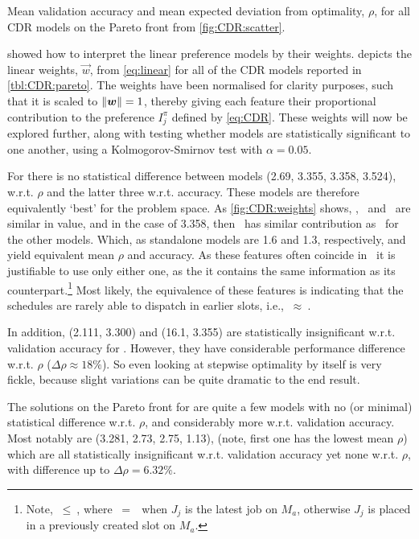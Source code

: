 \documentclass[smallextended]{svjour3}
\begin{document}
\begin{table}
    \caption{Mean validation accuracy and mean expected deviation from 
        optimality, $\rho$, for all CDR models on the Pareto front from 
        \cref{fig:CDR:scatter}.}\label{tbl:CDR:pareto}
    
\end{table}

 showed how to interpret the linear 
preference models by their weights. 
 depicts the linear weights, $\vec{w}$, from 
\cref{eq:linear} for all of the CDR models reported in \cref{tbl:CDR:pareto}. 
The weights have been normalised for clarity purposes, such that it is scaled 
to $\norm{\vec{w}}=1$, thereby giving each feature their proportional 
contribution to the preference $I_j^{\pi}$ defined by \cref{eq:CDR}. 
These weights will now be explored further, along with testing whether models 
are statistically significant to one another, using a 
Kolmogorov-Smirnov test with $\alpha=0.05$.

For   there is no statistical difference between models (2.69, 
3.355, 3.358, 3.524), w.r.t. $\rho$ and the latter three w.r.t. 
accuracy. These models are therefore equivalently `best' for the problem space.
As \cref{fig:CDR:weights} shows, \phiendTime, \phijobWrm\ and \phimacWrm\ are 
similar in value, and in the case of 3.358, then \phimacFree\ has similar 
contribution as \phiendTime\ for the other models. 
Which, as standalone models are 1.6 and 1.3, respectively, and yield 
equivalent mean $\rho$ and accuracy.
As these features often coincide in \jsp\, it is justifiable to use only 
either one, as the it contains the same information as its 
counterpart.\footnote{Note, \phiendTime$~\leq~$\phimacFree, where
    \phiendTime$~=~$\phimacFree\ when $J_j$ is the latest job on $M_a$, 
    otherwise $J_j$ is placed in a previously created slot on $M_a$.}
Most likely, the equivalence of these features is indicating that the 
schedules are rarely able to dispatch in earlier slots, i.e., 
\phiendTime$~\approx~$\phimacFree. 

In addition, (2.111, 3.300) and (16.1, 3.355) are statistically insignificant 
w.r.t. validation accuracy for . However, they have considerable 
performance difference w.r.t. $\rho$ ($\Delta\rho \approx 18\%$). 
So even looking at stepwise optimality by itself is very fickle, because slight 
variations can be quite dramatic to the end result. 

The solutions on the Pareto front for  are quite a few models
with no (or minimal) statistical difference w.r.t. $\rho$, and 
considerably more w.r.t. validation accuracy. 
Most notably are (3.281, 2.73, 2.75, 1.13), 
(note, first one has the lowest mean $\rho$) which are all statistically 
insignificant w.r.t. validation accuracy yet none w.r.t. $\rho$, with 
difference up to $\Delta\rho=6.32\%$.
\end{document}
